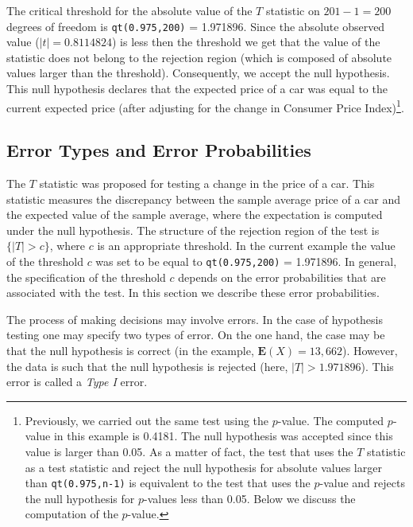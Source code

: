 \documentclass[]{krantz}
\newcommand{\Expec}{\mathbf{E}}
\theoremstyle{definition}
\theoremstyle{definition}
\theoremstyle{definition}
\theoremstyle{remark}
\begin{document}
The critical threshold for the absolute value of the \(T\) statistic on
\(201-1 = 200\) degrees of freedom is \texttt{qt(0.975,200)} = 1.971896. Since
the absolute observed value (\(|t| = 0.8114824\)) is less then the
threshold we get that the value of the statistic does not belong to the
rejection region (which is composed of absolute values larger than the
threshold). Consequently, we accept the null hypothesis. This null
hypothesis declares that the expected price of a car was equal to the
current expected price (after adjusting for the change in Consumer Price
Index)\footnote{Previously, we carried out the same test using the \(p\)-value. The
  computed \(p\)-value in this example is 0.4181. The null hypothesis
  was accepted since this value is larger than 0.05. As a matter of
  fact, the test that uses the \(T\) statistic as a test statistic and
  reject the null hypothesis for absolute values larger than
  \texttt{qt(0.975,n-1)} is equivalent to the test that uses the \(p\)-value
  and rejects the null hypothesis for \(p\)-values less than 0.05. Below
  we discuss the computation of the \(p\)-value.}.

\hypertarget{error-types-and-error-probabilities}{%
\subsection{Error Types and Error Probabilities}\label{error-types-and-error-probabilities}}

The \(T\) statistic was proposed for testing a change in the price of a
car. This statistic measures the discrepancy between the sample average
price of a car and the expected value of the sample average, where the
expectation is computed under the null hypothesis. The structure of the
rejection region of the test is \(\{|T| > c\}\), where \(c\) is an
appropriate threshold. In the current example the value of the threshold
\(c\) was set to be equal to \texttt{qt(0.975,200)} = 1.971896. In general, the
specification of the threshold \(c\) depends on the error probabilities
that are associated with the test. In this section we describe these
error probabilities.

The process of making decisions may involve errors. In the case of
hypothesis testing one may specify two types of error. On the one hand,
the case may be that the null hypothesis is correct (in the example,
\(\Expec(X) = 13,662\)). However, the data is such that the null
hypothesis is rejected (here, \(|T| > 1.971896\)). This error is called a
\emph{Type I} error.
\end{document}
